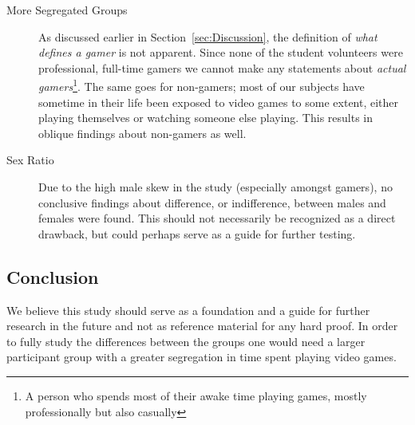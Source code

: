 \documentclass[runningheads,a4paper,oribibl]{llncs}
\begin{document}
\begin{description}
	\item[More Segregated Groups] As discussed earlier in Section~\ref{sec:Discussion}, the definition of \emph{what defines a gamer} is not apparent. Since none of the student volunteers were professional, full-time gamers we cannot make any statements about \emph{actual gamers}\footnote{A person who spends most of their awake time playing games, mostly professionally but also casually}. The same goes for non-gamers; most of our subjects have sometime in their life been exposed to video games to some extent, either playing themselves or watching someone else playing. This results in oblique findings about non-gamers as well.

	\item[Sex Ratio] Due to the high male skew in the study (especially amongst gamers), no conclusive findings about difference, or indifference, between males and females were found. This should not necessarily be recognized as a direct drawback, but could perhaps serve as a guide for further testing.
\end{description}



\subsection{Conclusion}
We believe this study should serve as a foundation and a guide for further research in the future and not as reference material for any hard proof. In order to fully study the differences between the groups one would need a larger participant group with a greater segregation in time spent playing video games.









\end{document}
